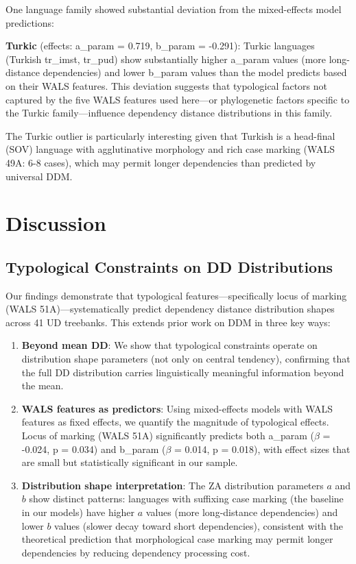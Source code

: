\documentclass[11pt,letterpaper]{article}
\begin{document}
One language family showed substantial deviation from the mixed-effects model predictions:

\textbf{Turkic} (effects: a\_param = 0.719, b\_param = -0.291): Turkic languages (Turkish tr\_imst, tr\_pud) show substantially higher a\_param values (more long-distance dependencies) and lower b\_param values than the model predicts based on their WALS features. This deviation suggests that typological factors not captured by the five WALS features used here---or phylogenetic factors specific to the Turkic family---influence dependency distance distributions in this family.

The Turkic outlier is particularly interesting given that Turkish is a head-final (SOV) language with agglutinative morphology and rich case marking (WALS 49A: 6-8 cases), which may permit longer dependencies than predicted by universal DDM.

\section{Discussion}

\subsection{Typological Constraints on DD Distributions}

Our findings demonstrate that typological features---specifically locus of marking (WALS 51A)---systematically predict dependency distance distribution shapes across 41 UD treebanks. This extends prior work on DDM in three key ways:

\begin{enumerate}
  \item \textbf{Beyond mean DD}: We show that typological constraints operate on distribution shape parameters (not only on central tendency), confirming that the full DD distribution carries linguistically meaningful information beyond the mean.

  \item \textbf{WALS features as predictors}: Using mixed-effects models with WALS features as fixed effects, we quantify the magnitude of typological effects. Locus of marking (WALS 51A) significantly predicts both a\_param ($\beta$ = -0.024, p = 0.034) and b\_param ($\beta$ = 0.014, p = 0.018), with effect sizes that are small but statistically significant in our sample.

  \item \textbf{Distribution shape interpretation}: The ZA distribution parameters $a$ and $b$ show distinct patterns: languages with suffixing case marking (the baseline in our models) have higher $a$ values (more long-distance dependencies) and lower $b$ values (slower decay toward short dependencies), consistent with the theoretical prediction that morphological case marking may permit longer dependencies by reducing dependency processing cost.
\end{enumerate}
\end{document}
